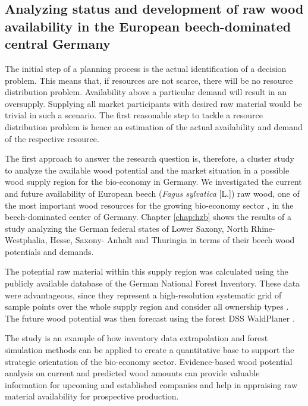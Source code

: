 \subsection{Analyzing status and development of raw wood availability in the European beech-dominated central Germany}
\label{subsec:intro:struct:hzb}
The initial step of a planning process is the actual identification of a decision problem. This means that, if resources are not scarce, there will be no resource distribution problem. Availability above a particular demand will result in an oversupply. Supplying all market participants with desired raw material would be trivial in such a scenario. The first reasonable step to tackle a resource distribution problem is hence an estimation of the actual availability and demand of the respective resource.

The first approach to answer the research question is, therefore, a cluster study to analyze the available wood potential and the market situation in a possible wood supply region for the bio-economy in Germany. We investigated the current and future availability of European beech (\textit{Fagus sylvatica} [L.]) raw wood, one of the most important wood resources for the growing bio-economy sector \citep[p. 16]{auer_2016}, in the beech-dominated center of Germany. Chapter \ref{chap:hzb} shows the results of a study analyzing the German federal states of Lower Saxony, North Rhine-Westphalia, Hesse, Saxony- Anhalt and Thuringia in terms of their beech wood potentials and demands.

The potential raw material within this supply region was calculated using the publicly available database of the German National Forest Inventory. These data were advantageous, since they represent a high-resolution systematic grid of sample points over the whole supply region and consider all ownership types \citep{schmitz_2008}. The future wood potential was then forecast using the forest DSS WaldPlaner \citep{hansen_2014}.

The study is an example of how inventory data extrapolation and forest simulation methods can be applied to create a quantitative base to support the strategic orientation of the bio-economy sector. Evidence-based wood potential analysis on current and predicted wood amounts can provide valuable information for upcoming and established companies and help in appraising raw material availability for prospective production.

